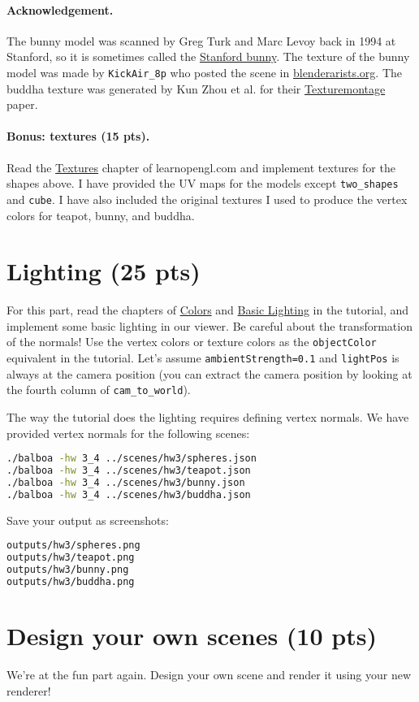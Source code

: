 \paragraph{Acknowledgement.} The bunny model was scanned by Greg Turk and Marc Levoy back in 1994 at Stanford, so it is sometimes called the \href{https://en.wikipedia.org/wiki/Stanford_bunny}{Stanford bunny}. The texture of the bunny model was made by \lstinline{KickAir_8p} who posted the scene in \href{https://blenderartists.org/t/uv-unwrapped-stanford-bunny-happy-spring-equinox/1101297}{blenderarists.org}. The buddha texture was generated by Kun Zhou et al. for their \href{http://kunzhou.net/tex-models.htm}{Texturemontage} paper.

\paragraph{Bonus: textures (15 pts).} Read the \href{https://learnopengl.com/Getting-started/Textures}{Textures} chapter of learnopengl.com and implement textures for the shapes above. I have provided the UV maps for the models except \lstinline{two_shapes} and \lstinline{cube}. I have also included the original textures I used to produce the vertex colors for teapot, bunny, and buddha.

\section{Lighting (25 pts)}
For this part, read the chapters of \href{https://learnopengl.com/Lighting/Colors}{Colors} and \href{https://learnopengl.com/Lighting/Basic-Lighting}{Basic Lighting} in the tutorial, and implement some basic lighting in our viewer. Be careful about the transformation of the normals! Use the vertex colors or texture colors as the \lstinline{objectColor} equivalent in the tutorial. Let's assume \lstinline{ambientStrength=0.1} and \lstinline{lightPos} is always at the camera position (you can extract the camera position by looking at the fourth column of \lstinline{cam_to_world}).

The way the tutorial does the lighting requires defining vertex normals. We have provided vertex normals for the following scenes:
\begin{lstlisting}[language=bash]
./balboa -hw 3_4 ../scenes/hw3/spheres.json
./balboa -hw 3_4 ../scenes/hw3/teapot.json
./balboa -hw 3_4 ../scenes/hw3/bunny.json
./balboa -hw 3_4 ../scenes/hw3/buddha.json
\end{lstlisting}

Save your output as screenshots:
\begin{lstlisting}[language=bash]
outputs/hw3/spheres.png
outputs/hw3/teapot.png
outputs/hw3/bunny.png
outputs/hw3/buddha.png
\end{lstlisting}

\section{Design your own scenes (10 pts)}
We're at the fun part again. Design your own scene and render it using your new renderer!

%
%


